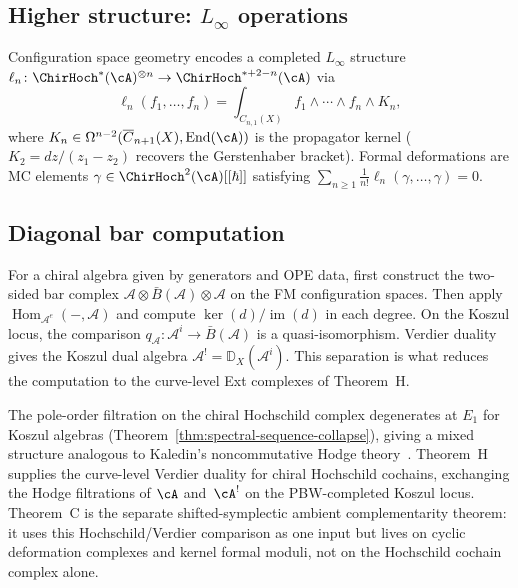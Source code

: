\subsection{\texorpdfstring{Higher structure: $L_\infty$ operations}{Higher structure: L-infinity operations}}

\begin{remark}\label{rem:L-infty-structure}
Configuration space geometry encodes a completed $L_\infty$ structure
$\ell_n\colon \ChirHoch^*(\cA)^{\otimes n} \to \ChirHoch^{*+2-n}(\cA)$ via
\[
\ell_n(f_1, \ldots, f_n) = \int_{C_{n,1}(X)} f_1 \wedge \cdots \wedge f_n
\wedge K_n,
\]
where $K_n \in \Omega^{n-2}(\overline{C}_{n+1}(X), \mathrm{End}(\cA))$
is the propagator kernel ($K_2 = dz/(z_1-z_2)$ recovers the Gerstenhaber
bracket). Formal deformations are MC elements
$\gamma \in \ChirHoch^2(\cA)[[\hbar]]$ satisfying
$\sum_{n \geq 1} \frac{1}{n!}\ell_n(\gamma, \ldots, \gamma) = 0$.
\end{remark}

\subsection{Diagonal bar computation}

\begin{remark}\label{rem:compute-HH}
For a chiral algebra given by generators and OPE data, first construct
the two-sided bar complex
$\mathcal A\otimes\bar B(\mathcal A)\otimes\mathcal A$ on the FM
configuration spaces. Then apply
$\operatorname{Hom}_{\mathcal A^e}(-,\mathcal A)$ and compute
$\ker(d)/\operatorname{im}(d)$ in each degree.  On the Koszul locus,
the comparison
$q_\mathcal A\colon\mathcal A^i\to\bar B(\mathcal A)$ is a
quasi-isomorphism.  Verdier duality gives the Koszul dual algebra
$\mathcal A^!=\mathbb D_X(\mathcal A^i)$. This separation is what
reduces the computation to the curve-level Ext complexes of Theorem~H.
\end{remark}

\begin{remark}\label{rem:nc-hodge-degeneration}
The pole-order filtration on the chiral Hochschild complex degenerates
at $E_1$ for Koszul algebras
(Theorem~\ref{thm:spectral-sequence-collapse}), giving a mixed
structure analogous to Kaledin's noncommutative Hodge
theory~\cite{Kal08}. Theorem~H supplies the curve-level Verdier
duality for chiral Hochschild cochains, exchanging the Hodge
filtrations of $\cA$ and~$\cA^!$ on the PBW-completed Koszul locus.
Theorem~C is the separate shifted-symplectic ambient complementarity
theorem: it uses this Hochschild/Verdier comparison as one input but
lives on cyclic deformation complexes and kernel formal moduli, not on
the Hochschild cochain complex alone.
\end{remark}

